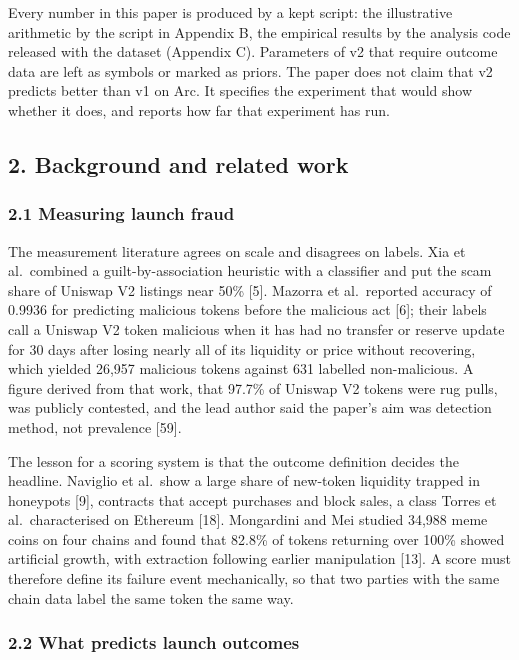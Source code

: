 Every number in this paper is produced by a kept script: the illustrative arithmetic by the script in Appendix B, the empirical results by the analysis code released with the dataset (Appendix C). Parameters of v2 that require outcome data are left as symbols or marked as priors. The paper does not claim that v2 predicts better than v1 on Arc. It specifies the experiment that would show whether it does, and reports how far that experiment has run.

\subsection{2. Background and related work}\label{background-and-related-work}

\subsubsection{2.1 Measuring launch fraud}\label{measuring-launch-fraud}

The measurement literature agrees on scale and disagrees on labels. Xia et al.~combined a guilt-by-association heuristic with a classifier and put the scam share of Uniswap V2 listings near 50\% {[}5{]}. Mazorra et al.~reported accuracy of 0.9936 for predicting malicious tokens before the malicious act {[}6{]}; their labels call a Uniswap V2 token malicious when it has had no transfer or reserve update for 30 days after losing nearly all of its liquidity or price without recovering, which yielded 26,957 malicious tokens against 631 labelled non-malicious. A figure derived from that work, that 97.7\% of Uniswap V2 tokens were rug pulls, was publicly contested, and the lead author said the paper's aim was detection method, not prevalence {[}59{]}.

The lesson for a scoring system is that the outcome definition decides the headline. Naviglio et al.~show a large share of new-token liquidity trapped in honeypots {[}9{]}, contracts that accept purchases and block sales, a class Torres et al.~characterised on Ethereum {[}18{]}. Mongardini and Mei studied 34,988 meme coins on four chains and found that 82.8\% of tokens returning over 100\% showed artificial growth, with extraction following earlier manipulation {[}13{]}. A score must therefore define its failure event mechanically, so that two parties with the same chain data label the same token the same way.

\subsubsection{2.2 What predicts launch outcomes}\label{what-predicts-launch-outcomes}

